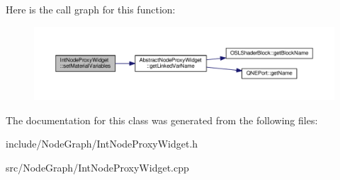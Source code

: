 Here is the call graph for this function\-:
\nopagebreak
\begin{figure}[H]
\begin{center}
\leavevmode
\includegraphics[width=350pt]{class_int_node_proxy_widget_a04d972bdd37258011454c1fc116723cd_cgraph}
\end{center}
\end{figure}




The documentation for this class was generated from the following files\-:\begin{DoxyCompactItemize}
\item 
include/\-Node\-Graph/Int\-Node\-Proxy\-Widget.\-h\item 
src/\-Node\-Graph/Int\-Node\-Proxy\-Widget.\-cpp\end{DoxyCompactItemize}
